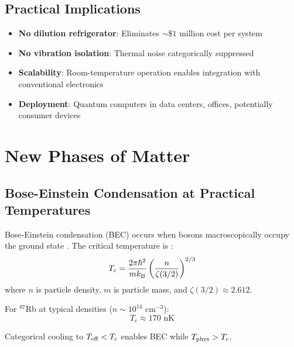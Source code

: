 \subsection{Practical Implications}

\begin{itemize}
    \item \textbf{No dilution refrigerator}: Eliminates $\sim \$1$ million cost per system

    \item \textbf{No vibration isolation}: Thermal noise categorically suppressed

    \item \textbf{Scalability}: Room-temperature operation enables integration with conventional electronics

    \item \textbf{Deployment}: Quantum computers in data centers, offices, potentially consumer devices
\end{itemize}

\section{New Phases of Matter}

\subsection{Bose-Einstein Condensation at Practical Temperatures}

Bose-Einstein condensation (BEC) occurs when bosons macroscopically occupy the ground state \cite{bose1924,einstein1925}. The critical temperature is \cite{pitaevskii2003}:
\begin{equation}
T_c = \frac{2\pi\hbar^2}{mk_{\mathrm{B}}} \left(\frac{n}{\zeta(3/2)}\right)^{2/3}
\label{eq:bec_tc}
\end{equation}
where $n$ is particle density, $m$ is particle mass, and $\zeta(3/2) \approx 2.612$.

For $^{87}$Rb at typical densities ($n \sim 10^{14}$ cm$^{-3}$):
\begin{equation}
T_c \approx 170 \text{ nK}
\end{equation}

\begin{theorem}
\label{thm:warm_bec}
Categorical cooling to $T_{\mathrm{eff}} < T_c$ enables BEC while $T_{\mathrm{phys}} > T_c$.
\end{theorem}

